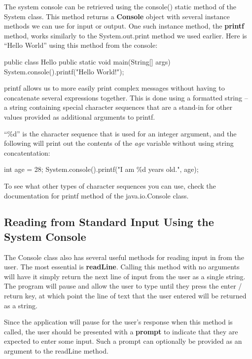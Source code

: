 The system console can be retrieved using the console() static method of the System class. This method returns a \textbf{Console} object with several instance methods we can use for input or output. One such instance method, the \textbf{printf} method, works similarly to the System.out.print method we used earlier. Here is ``Hello World'' using this method from the console:

\begin{code}
public class Hello {
  public static void main(String[] args) {
    System.console().printf("Hello World!");
  }
}
\end{code}

printf allows us to more easily print complex messages without having to concatenate several expressions together. This is done using a formatted string -- a string containing special character sequences that are a stand-in for other values provided as additional arguments to printf. 

\begin{exa}
``\%d'' is the character sequence that is used for an integer argument, and the following will print out the contents of the \textit{age} variable without using string concatentation:

\begin{code}
int age = 28;
System.console().printf("I am \%d years old.", age);
\end{code}
\end{exa}

To see what other types of character sequences you can use, check the documentation for printf method of the java.io.Console class. 

\subsection{Reading from Standard Input Using the System Console}

The Console class also has several useful methods for reading input in from the user. The most essential is \textbf{readLine}. Calling this method with no arguments will have it simply return the next line of input from the user as a single string. The program will pause and allow the user to type until they press the enter / return key, at which point the line of text that the user entered will be returned as a string. 

Since the application will pause for the user's response when this method is called, the user should be presented with a \textbf{prompt} to indicate that they are expected to enter some input. Such a prompt can optionally be provided as an argument to the readLine method. 



